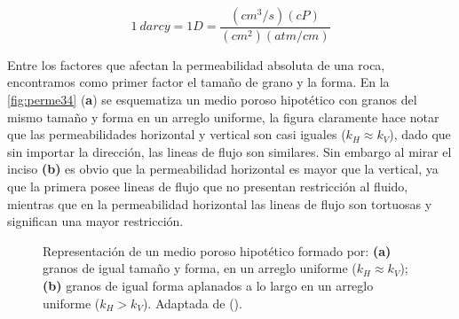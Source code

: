 \begin{equation}
1~darcy = 1D = \frac{(cm^{3}/s)(cP)}{(cm^{2})(atm/cm)}
\end{equation}

Entre los factores que afectan la permeabilidad absoluta de una roca, encontramos como primer factor el tamaño de grano y la forma. En la \autoref{fig:perme34} (\textbf{a}) se esquematiza un medio poroso hipotético con granos del mismo tamaño y forma en un arreglo uniforme, la figura claramente hace notar que las permeabilidades horizontal y vertical son casi iguales ($k_{H} \approx k_{V}$), dado que sin importar la dirección, las lineas de flujo son similares. Sin embargo al mirar el inciso \textbf{(b)} es obvio que la permeabilidad horizontal es mayor que la vertical, ya que la primera posee lineas de flujo que no presentan restricción al fluido, mientras que en la permeabilidad horizontal las lineas de flujo son tortuosas y significan una mayor restricción.

\begin{figure} \centering
     \quad
    \caption[Permeabilidad vertical y horizontal]{Representación de un medio poroso hipotético formado por: \textbf{(a)} granos de igual tamaño y forma, en un arreglo uniforme ($k_{H}\approx k_{V}$); \textbf{(b)} granos de igual forma aplanados a lo largo en un arreglo uniforme ($k_{H} > k_{V}$). Adaptada de (\cite{Dandekar}).}
    \label{fig:perme34}
\end{figure}

